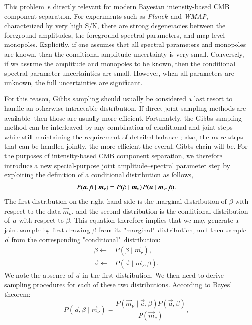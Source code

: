 \documentclass{aa}
\def\Planck{\textit{Planck}}
\def\,{\thinspace}
\def\WMAP{\emph{WMAP}}
\renewcommand{\a}[0]{\vec{a}}
\newcommand{\m}[0]{\vec{m}}
\begin{document}
This problem is directly relevant for modern Bayesian intensity-based
CMB component separation. For experiments such as \Planck\ and \WMAP,
characterized by very high S/N, there are strong
degeneracies between the foreground amplitudes, the foreground
spectral parameters, and map-level monopoles. Explicitly, if one
assumes that all spectral parameters and monopoles are known, then the
conditional amplitude uncertainty is very small. Conversely, if we
assume the amplitude and monopoles to be known, then the conditional
spectral parameter uncertainties are small. However, when all
parameters are unknown, the full uncertainties are significant.

For this reason, Gibbs sampling should usually be considered a last
resort to handle an otherwise intractable distribution. If direct
joint sampling methods are available, then those are usually more
efficient. Fortunately, the Gibbs sampling method can be interleaved
by any combination of conditional and joint steps while still
maintaining the requirement of detailed balance \citep{geman:1984}; also, the more steps that can be handled jointly, the more efficient the
overall Gibbs chain will be. For the purposes of intensity-based CMB
component separation, we therefore introduce a new special-purpose
joint amplitude--spectral parameter step by exploiting the definition
of a conditional distribution as follows, 
\begin{equation}
  P(\a,\beta\mid\m_\nu) = P(\beta\mid\m_\nu)\, P(\a\mid\m_\nu,\beta).
  \label{eq:joint_P_to_marg_cond}
\end{equation}
The first distribution on the right hand side is the marginal
distribution of $\beta$ with respect to the data $\m_\nu$, and the second
distribution is the conditional distribution of $\a$ with respect to
$\beta$. This equation therefore implies that we may generate a joint
sample by first drawing $\beta$ from its \emph{}
"marginal"\ distribution, and then sample $\a$ from the corresponding
"conditional"\ distribution:
\begin{align*}
 \beta \leftarrow & P(\beta\mid\m_{\nu}),\\\label{eq:beta_marg} 
 \a\leftarrow & P(\a\mid\m_{\nu},\beta).
\end{align*}
We note the absence of $\a$ in the first distribution.
We then need to derive sampling procedures for each of these two
distributions. According to Bayes' theorem:
\begin{equation}
 P(\a,\beta\mid\m_{\nu}) = \frac{P(\m_{\nu}\mid\a,\beta) P(\a,\beta)}{P(\m_{\nu})}, \label{eq:joint_P_Bayes}
\end{equation}
\end{document}
